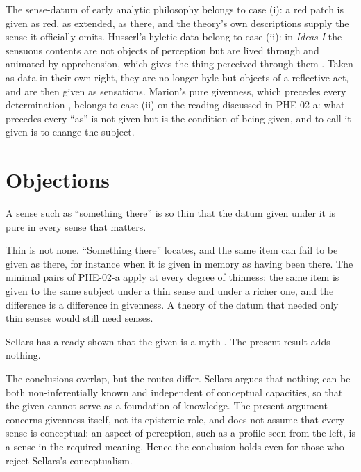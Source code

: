 \documentclass{situationist-preprint}
\begin{document}
The sense-datum of early analytic philosophy belongs to case (i): a red patch is given as red, as extended, as there, and the theory's own descriptions supply the sense it officially omits. Husserl's hyletic data belong to case (ii): in \emph{Ideas I} the sensuous contents are not objects of perception but are lived through and animated by apprehension, which gives the thing perceived through them \citep[\S85]{Husserl1913}. Taken as data in their own right, they are no longer hyle but objects of a reflective act, and are then given as sensations. Marion's pure givenness, which precedes every determination \citep{Marion1997}, belongs to case (ii) on the reading discussed in PHE-02-a: what precedes every \enquote{as} is not given but is the condition of being given, and to call it given is to change the subject.

\section{Objections}

\begin{objection}
A sense such as \enquote{something there} is so thin that the datum given under it is pure in every sense that matters.
\end{objection}

\begin{reply}
Thin is not none. \enquote{Something there} locates, and the same item can fail to be given as there, for instance when it is given in memory as having been there. The minimal pairs of PHE-02-a apply at every degree of thinness: the same item is given to the same subject under a thin sense and under a richer one, and the difference is a difference in givenness. A theory of the datum that needed only thin senses would still need senses.
\end{reply}

\begin{objection}
Sellars has already shown that the given is a myth \citep{Sellars1956}. The present result adds nothing.
\end{objection}

\begin{reply}
The conclusions overlap, but the routes differ. Sellars argues that nothing can be both non-inferentially known and independent of conceptual capacities, so that the given cannot serve as a foundation of knowledge. The present argument concerns givenness itself, not its epistemic role, and does not assume that every sense is conceptual: an aspect of perception, such as a profile seen from the left, is a sense in the required meaning. Hence the conclusion holds even for those who reject Sellars's conceptualism.
\end{reply}
\end{document}
